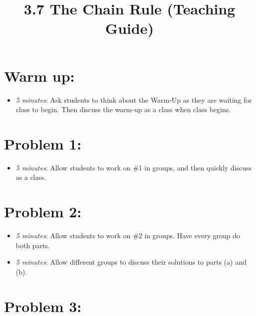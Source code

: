 \documentclass[handout,nooutcomes]{ximera}
\title{3.7 The Chain Rule (Teaching Guide)}
\begin{document}
\begin{abstract}		\end{abstract}
\maketitle


\section*{Warm up:} 
	
	\begin{itemize}
	
	\item  \emph{5 minutes}:  Ask students to think about the Warm-Up as they are waiting for class to begin.  Then discuss the warm-up as a class when class begins.
	
	
	
	\end{itemize}


\section*{Problem 1:}

	\begin{itemize}
	
	\item  \emph{5 minutes}:  Allow students to work on \#1 in groups, and then quickly discuss as a class.  
	
	\end{itemize}



\section*{Problem 2:}

	\begin{itemize}
	
	\item  \emph{5 minutes}:  Allow students to work on \#2 in groups.  Have every group do both parts.
		
	\item  \emph{5 minutes}:  Allow different groups to discuss their solutions to parts (a) and (b).  
			
	\end{itemize}
	
	
	
\section*{Problem 3:}
\end{document}
